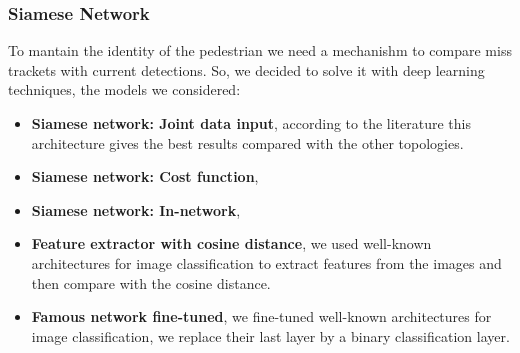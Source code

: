\documentclass[12pt, a4paper, titlepage,twoside,openright]{article}
\begin{document}
\subsubsection{Siamese Network}


To mantain the identity of the pedestrian we need a mechanishm to compare miss trackets with current detections. So, we decided to solve it with deep learning techniques, the models we considered:


\begin{itemize}

\item \textbf{Siamese network: Joint data input}, according to the literature this architecture gives the best results compared with the other topologies. 

\item \textbf{Siamese network: Cost function}, 
\item \textbf{Siamese network: In-network},

\item \textbf{Feature extractor with cosine distance}, we used well-known architectures for image classification to extract features from the images and then compare with the cosine distance.


\item \textbf{Famous network fine-tuned}, we fine-tuned  well-known architectures for image classification, we replace their last layer by a binary classification layer.


\end{itemize}
\end{document}

